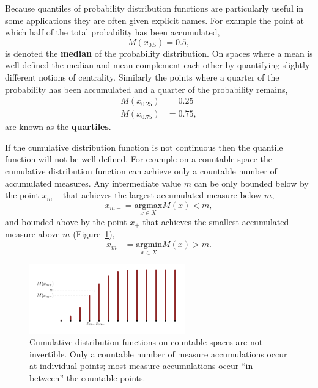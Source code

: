 \documentclass[
  letterpaper,
  DIV=11,
  numbers=noendperiod]{scrartcl}
\begin{document}
Because quantiles of probability distribution functions are particularly
useful in some applications they are often given explicit names. For
example the point at which half of the total probability has been
accumulated, \[
M(x_{0.5}) = 0.5,
\] is denoted the \textbf{median} of the probability distribution. On
spaces where a mean is well-defined the median and mean complement each
other by quantifying slightly different notions of centrality. Similarly
the points where a quarter of the probability has been accumulated and a
quarter of the probability remains, \begin{align*}
M(x_{0.25}) &= 0.25
\\
M(x_{0.75}) &= 0.75,
\end{align*} are known as the \textbf{quartiles}.

If the cumulative distribution function is not continuous then the
quantile function will not be well-defined. For example on a countable
space the cumulative distribution function can achieve only a countable
number of accumulated measures. Any intermediate value \(m\) can be only
bounded below by the point \(x_{m-}\) that achieves the largest
accumulated measure below \(m\), \[
x_{m-} = \underset{x \in X}{\mathrm{argmax}} M(x) < m,
\] and bounded above by the point \(x_{+}\) that achieves the smallest
accumulated measure above \(m\)
(Figure~\ref{fig-quantile-inverse-problems}), \[
x_{m+} = \underset{x \in X}{\mathrm{argmin}} M(x) > m.
\]

\begin{figure}

{\centering \includegraphics[width=0.6\textwidth,height=\textheight]{figures/quantiles/inverse_problems/inverse_problems.pdf}

}

\caption{\label{fig-quantile-inverse-problems}Cumulative distribution
functions on countable spaces are not invertible. Only a countable
number of measure accumulations occur at individual points; most measure
accumulations occur ``in between'' the countable points.}

\end{figure}
\end{document}
